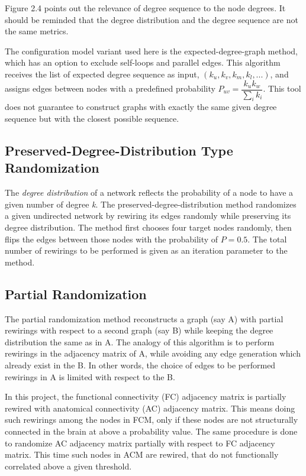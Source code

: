 Figure 2.4 points out the relevance of degree sequence to the node degrees. It should be reminded that the degree distribution and the degree sequence are not the same metrics.  

The configuration model variant used here is the expected-degree-graph method, which has an option to exclude self-loops and parallel edges. This algorithm receives the list of expected degree sequence as input, $(k_u, k_v, k_m, k_l, ...)$, and assigns edges between nodes with a predefined probability $P_{uv}=\dfrac{k_u k_w}{\sum_{i}k_i}$. This tool does not guarantee to construct graphs with exactly the same given degree sequence but with the closest possible sequence.  

\subsection{Preserved-Degree-Distribution Type Randomization}

The \textit{degree distribution} of a network reflects the probability of a node to have a given number of degree \textit{k}. The preserved-degree-distribution method randomizes a given undirected network by rewiring its edges randomly while preserving its degree distribution. The method first chooses four target nodes randomly, then flips the edges between those nodes with the probability of $P=0.5$. The total number of rewirings to be performed is given as an iteration parameter to the method. 

 
\subsection{Partial Randomization}
 
The partial randomization method  reconstructs a graph (say A) with partial rewirings with respect to a second graph (say B) while keeping the degree distribution the same as in A. The analogy of this algorithm is to perform rewirings in the adjacency matrix of A, while avoiding any edge generation which already exist in the B. In other words, the choice of edges to be performed rewirings in A is limited with respect to the B. 

In this project, the functional connectivity (FC) adjacency matrix is partially rewired with anatomical connectivity (AC) adjacency matrix.  This means doing such rewirings among the nodes in FCM, only if these nodes are not structurally connected in the brain at above a probability value. The same procedure is done to randomize AC adjacency matrix partially with respect to FC adjacency matrix.  This time such nodes in ACM are rewired, that do not functionally correlated above a given threshold.   


